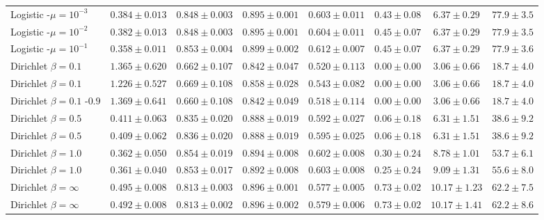 \begin{table}[h]
\begin{tabularx}{\linewidth}{l c c c c c c c}
Logistic \fedprox{}-$\mu\!=\!10^{-3}$   & $0.384\!\pm\!0.013$ & $0.848\!\pm\!0.003$ & $0.895\!\pm\!0.001$ & $0.603\!\pm\!0.011$ & $0.43\!\pm\!0.08$ & $6.37\!\pm\!0.29$ & $77.9\!\pm\!3.5$ \\
Logistic \fedprox{}-$\mu\!=\!10^{-2}$   & $0.382\!\pm\!0.013$ & $0.848\!\pm\!0.003$ & $0.895\!\pm\!0.001$ & $0.604\!\pm\!0.011$ & $0.45\!\pm\!0.07$ & $6.37\!\pm\!0.29$ & $77.9\!\pm\!3.5$ \\
Logistic \fedprox{}-$\mu\!=\!10^{-1}$   & $0.358\!\pm\!0.011$ & $0.853\!\pm\!0.004$ & $0.899\!\pm\!0.002$ & $0.612\!\pm\!0.007$ & $0.45\!\pm\!0.07$ & $6.37\!\pm\!0.29$ & $77.9\!\pm\!3.6$ \\
\midrule
Dirichlet $\beta\!=\!0.1$ \fedavg{}     & $1.365\!\pm\!0.620$ & $0.662\!\pm\!0.107$ & $0.842\!\pm\!0.047$ & $0.520\!\pm\!0.113$ & $0.00\!\pm\!0.00$ & $3.06\!\pm\!0.66$ & $18.7\!\pm\!4.0$ \\
Dirichlet $\beta\!=\!0.1$ \fedprox{}    & $1.226\!\pm\!0.527$ & $0.669\!\pm\!0.108$ & $0.858\!\pm\!0.028$ & $0.543\!\pm\!0.082$ & $0.00\!\pm\!0.00$ & $3.06\!\pm\!0.66$ & $18.7\!\pm\!4.0$ \\
Dirichlet $\beta\!=\!0.1$ \cvar{}-$0.9$ & $1.369\!\pm\!0.641$ & $0.660\!\pm\!0.108$ & $0.842\!\pm\!0.049$ & $0.518\!\pm\!0.114$ & $0.00\!\pm\!0.00$ & $3.06\!\pm\!0.66$ & $18.7\!\pm\!4.0$ \\
Dirichlet $\beta\!=\!0.5$ \fedavg{}     & $0.411\!\pm\!0.063$ & $0.835\!\pm\!0.020$ & $0.888\!\pm\!0.019$ & $0.592\!\pm\!0.027$ & $0.06\!\pm\!0.18$ & $6.31\!\pm\!1.51$ & $38.6\!\pm\!9.2$ \\
Dirichlet $\beta\!=\!0.5$ \fedprox{}    & $0.409\!\pm\!0.062$ & $0.836\!\pm\!0.020$ & $0.888\!\pm\!0.019$ & $0.595\!\pm\!0.025$ & $0.06\!\pm\!0.18$ & $6.31\!\pm\!1.51$ & $38.6\!\pm\!9.2$ \\
Dirichlet $\beta\!=\!1.0$ \fedavg{}     & $0.362\!\pm\!0.050$ & $0.854\!\pm\!0.019$ & $0.894\!\pm\!0.008$ & $0.602\!\pm\!0.008$ & $0.30\!\pm\!0.24$ & $8.78\!\pm\!1.01$ & $53.7\!\pm\!6.1$ \\
Dirichlet $\beta\!=\!1.0$ \fedprox{}    & $0.361\!\pm\!0.040$ & $0.853\!\pm\!0.017$ & $0.892\!\pm\!0.008$ & $0.603\!\pm\!0.008$ & $0.25\!\pm\!0.24$ & $9.09\!\pm\!1.31$ & $55.6\!\pm\!8.0$ \\
Dirichlet $\beta\!=\!\infty$ \fedavg{}  & $0.495\!\pm\!0.008$ & $0.813\!\pm\!0.003$ & $0.896\!\pm\!0.001$ & $0.577\!\pm\!0.005$ & $0.73\!\pm\!0.02$ & $10.17\!\pm\!1.23$ & $62.2\!\pm\!7.5$ \\
Dirichlet $\beta\!=\!\infty$ \fedprox{} & $0.492\!\pm\!0.008$ & $0.813\!\pm\!0.002$ & $0.896\!\pm\!0.002$ & $0.579\!\pm\!0.006$ & $0.73\!\pm\!0.02$ & $10.17\!\pm\!1.41$ & $62.2\!\pm\!8.6$ \\
\bottomrule
\end{tabularx}
\end{table}

